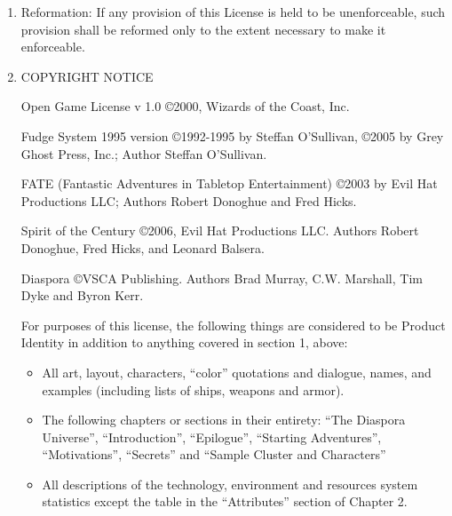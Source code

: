 {\begin{enumerate}
Termination: This License will terminate automatically if You fail to comply with all terms herein and fail to cure such breach within 30 days of becoming aware of the breach. All sublicenses shall survive the termination of this License.

\item

Reformation: If any provision of this License is held to be unenforceable, such provision shall be reformed only to the extent necessary to make it enforceable.

\item

COPYRIGHT NOTICE

Open Game License v 1.0 \copyright 2000, Wizards of the Coast, Inc.

Fudge System 1995 version \copyright 1992-1995 by Steffan O'Sullivan, \copyright 2005 by Grey Ghost Press, Inc.; Author Steffan O'Sullivan.

FATE (Fantastic Adventures in Tabletop Entertainment) \copyright 2003 by Evil Hat Productions LLC; Authors Robert Donoghue and Fred Hicks.

Spirit of the Century \copyright 2006, Evil Hat Productions LLC. Authors Robert Donoghue, Fred Hicks, and Leonard Balsera.

Diaspora \copyright VSCA Publishing. Authors Brad Murray, C.W. Marshall, Tim Dyke and Byron Kerr.

For purposes of this license, the following things are considered to be Product Identity in addition to anything covered in section 1, above:

\begin{itemize}
\item All art, layout, characters, ``color'' quotations and dialogue, names, and examples (including lists of ships, weapons and armor).
\item The following chapters or sections in their entirety: ``The Diaspora Universe'', ``Introduction'', ``Epilogue'', ``Starting Adventures'', ``Motivations'', ``Secrets'' and ``Sample Cluster and Characters''
\item All descriptions of the technology, environment and resources system statistics except the table in the ``Attributes'' section of Chapter 2.
\end{itemize}

\end{enumerate}
}%

